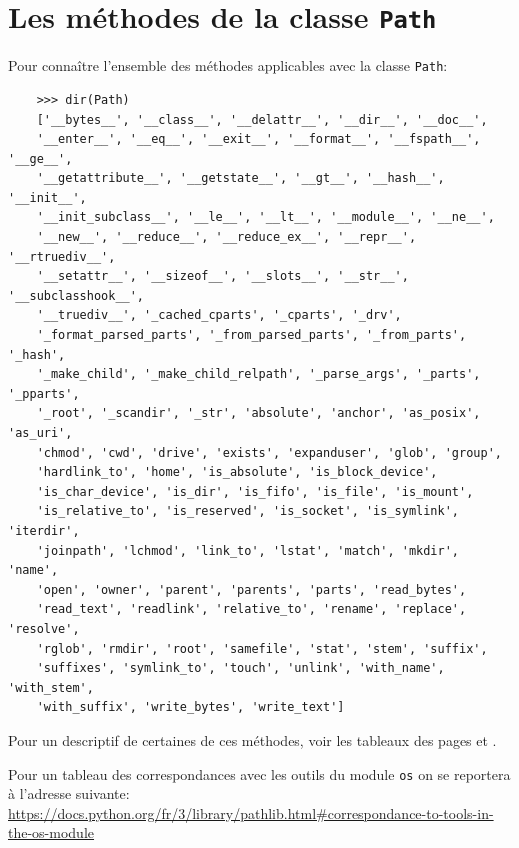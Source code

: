 \documentclass[a4paper,11pt]{book}
\begin{document}
\section{Les méthodes de la classe \texttt{Path}}
Pour connaître l'ensemble des méthodes applicables avec la classe \texttt{Path}:
\begin{verbatim}
    >>> dir(Path)
    ['__bytes__', '__class__', '__delattr__', '__dir__', '__doc__', 
    '__enter__', '__eq__', '__exit__', '__format__', '__fspath__', '__ge__', 
    '__getattribute__', '__getstate__', '__gt__', '__hash__', '__init__', 
    '__init_subclass__', '__le__', '__lt__', '__module__', '__ne__', 
    '__new__', '__reduce__', '__reduce_ex__', '__repr__', '__rtruediv__', 
    '__setattr__', '__sizeof__', '__slots__', '__str__', '__subclasshook__', 
    '__truediv__', '_cached_cparts', '_cparts', '_drv', 
    '_format_parsed_parts', '_from_parsed_parts', '_from_parts', '_hash', 
    '_make_child', '_make_child_relpath', '_parse_args', '_parts', '_pparts', 
    '_root', '_scandir', '_str', 'absolute', 'anchor', 'as_posix', 'as_uri', 
    'chmod', 'cwd', 'drive', 'exists', 'expanduser', 'glob', 'group', 
    'hardlink_to', 'home', 'is_absolute', 'is_block_device', 
    'is_char_device', 'is_dir', 'is_fifo', 'is_file', 'is_mount', 
    'is_relative_to', 'is_reserved', 'is_socket', 'is_symlink', 'iterdir', 
    'joinpath', 'lchmod', 'link_to', 'lstat', 'match', 'mkdir', 'name', 
    'open', 'owner', 'parent', 'parents', 'parts', 'read_bytes', 
    'read_text', 'readlink', 'relative_to', 'rename', 'replace', 'resolve', 
    'rglob', 'rmdir', 'root', 'samefile', 'stat', 'stem', 'suffix', 
    'suffixes', 'symlink_to', 'touch', 'unlink', 'with_name', 'with_stem', 
    'with_suffix', 'write_bytes', 'write_text']
\end{verbatim}
\medskip

Pour un descriptif de certaines de ces méthodes, voir les tableaux des pages \pageref{pathlib_1} et \pageref{pathlib_2}. \medskip

Pour un tableau des correspondances avec les outils du module \texttt{os} on se reportera à l'adresse suivante: \\ \url{https://docs.python.org/fr/3/library/pathlib.html\#correspondance-to-tools-in-} \\
\url{the-os-module}
\medskip
\end{document}

